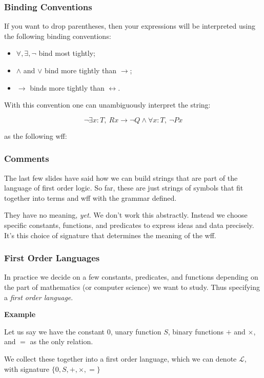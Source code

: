 \documentclass{beamer}
\theoremstyle{indentDefn} \newtheorem{defn}[]{Definition}
\begin{document}
\begin{frame}
	\frametitle{Binding Conventions}
	
	If you want to drop parentheses, then your expressions will be interpreted using the following binding conventions: 
	
	\begin{itemize}
		\item $\forall, \exists, \lnot$ bind most tightly; 
		\item $\land$ and $\lor$ bind more tightly than $\rightarrow$; 
		\item $\rightarrow$ binds more tightly than $\leftrightarrow$. 
	\end{itemize}

	\vspace{0.5cm}

	With this convention one can unambiguously interpret the string:
	
	$$ \lnot \exists x : T, \ Rx \rightarrow \lnot Q \land \forall x : T, \ \lnot Px$$
	
	as the following wff:
	
	
	
\end{frame}

\begin{frame}
	\frametitle{Comments}
	
	The last few slides have said how we can build strings that are part of the language of first order logic. So far, these are just strings of symbols that fit together into terms and wff with the grammar defined. 
	
	\vspace{0.5cm}
	
	They have no meaning, \emph{yet}. We don't work this abstractly. Instead we choose specific constants, functions, and predicates to express ideas and data precisely. It's this choice of signature that determines the meaning of the wff. 
	
\end{frame}

\begin{frame}
	\frametitle{First Order Languages}
	
	In practice we decide on a few constants, predicates, and functions depending on the part of mathematics (or computer science) we want to study. Thus specifying a \emph{first order language}.
	
	\vspace{0.5cm}
	
	{\bf Example} 
	
	Let us say we have the constant $0$, unary function $S$, binary functions $+$ and $\times$, and $=$ as the only relation.
	\vspace{0.5cm}	
	
	We collect these together into a first order language, which we can denote $\mathcal{L}$, with signature $\{0,S,+,\times,=\}$
	\vspace{1cm}
	
	
\end{frame}
\end{document}
